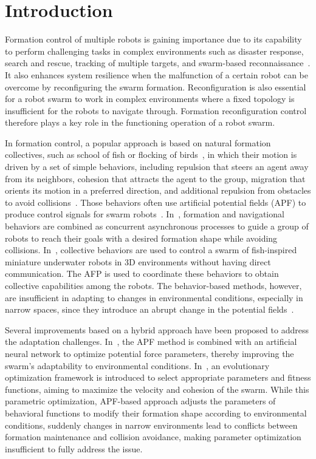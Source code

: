 \section{Introduction}
Formation control of multiple robots is gaining importance due to its capability to perform challenging tasks in complex environments such as disaster response, search and rescue, tracking of multiple targets, and swarm-based reconnaissance~\cite{9306908,Oh2015}. It also enhances system resilience when the malfunction of a certain robot can be overcome by reconfiguring the swarm formation. Reconfiguration is also essential for a robot swarm to work in complex environments where a fixed topology is insufficient for the robots to navigate through. Formation reconfiguration control therefore plays a key role in the functioning operation of a robot swarm.

In formation control, a popular approach is based on natural formation collectives, such as school of fish or flocking of birds~\cite {Nagy2010}, in which their motion is driven by a set of simple behaviors, including repulsion that steers an agent away from its neighbors, cohesion that attracts the agent to the group, migration that orients its motion in a preferred direction, and additional repulsion from obstacles to avoid collisions~\cite{Reynolds1987}. Those behaviors often use artificial potential fields (APF) to produce control signals for swarm robots~\cite{736776,Berlinger2021,9565893}. In~\cite{736776}, formation and navigational behaviors are combined as concurrent
asynchronous processes to guide a group of robots to reach their goals with a desired formation shape while avoiding collisions. In~\cite{Berlinger2021}, collective behaviors are used to control a swarm of fish-inspired miniature underwater robots in 3D environments without having direct communication. The AFP is used to coordinate these behaviors to obtain collective capabilities among the robots. The behavior-based methods, however, are insufficient in adapting to changes in environmental conditions, especially in narrow spaces, since they introduce an abrupt change in the potential fields~\cite{Zhang2023}.

Several improvements based on a hybrid approach have been proposed to address the adaptation challenges. In~\cite{Elkilany2020}, the APF method is combined with an artificial neural network to optimize potential force parameters, thereby improving the swarm's adaptability to environmental conditions. In~\cite{Vsrhelyi2018}, an evolutionary optimization framework is introduced to select appropriate parameters and fitness functions, aiming to maximize the velocity and cohesion of the swarm. While this parametric optimization, APF-based approach adjusts the parameters of behavioral functions to modify their formation shape according to environmental conditions, suddenly changes in narrow environments lead to conflicts between formation maintenance and collision avoidance, making parameter optimization insufficient to fully address the issue. 

